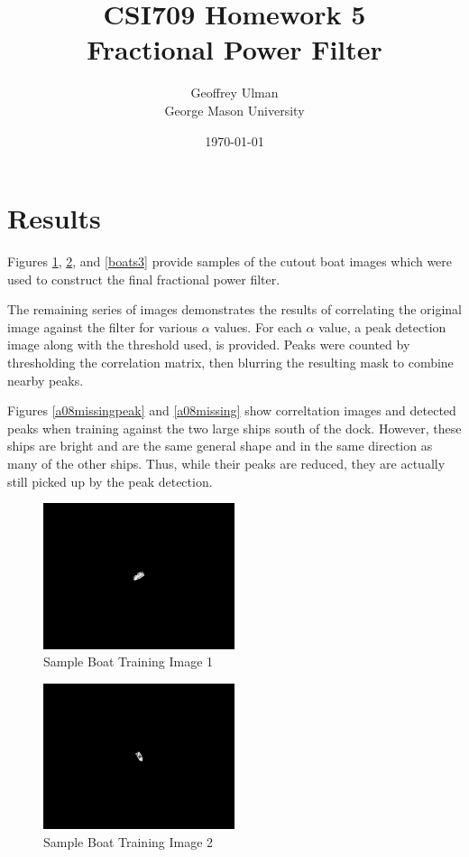 \documentclass[12pt]{article}
\begin{document}
\title{CSI709 Homework 5 \\
Fractional Power Filter}
\author{
        Geoffrey Ulman \\
        George Mason University\\
}
\date{\today}

\maketitle

\section{Results}

Figures \ref{boats1}, \ref{boats2}, and \ref{boats3} provide samples of the cutout boat images which were used to construct the final fractional power filter.

The remaining series of images demonstrates the results of correlating the original image against the filter for various \(\alpha\) values. For each \(\alpha\) value, a peak detection image along with the threshold used, is provided. Peaks were counted by thresholding the correlation matrix, then blurring the resulting mask to combine nearby peaks.

Figures \ref{a08missingpeak} and \ref{a08missing} show correltation images and detected peaks when training against the two large ships south of the dock. However, these ships are bright and are the same general shape and in the same direction as many of the other ships. Thus, while their peaks are reduced, they are actually still picked up by the peak detection.

\begin{figure}
\centering
\includegraphics[width=0.50\textwidth]{plotBoat1.png}
\caption{Sample Boat Training Image 1}
\label{boats1}
\end{figure}

\begin{figure}
\centering
\includegraphics[width=0.50\textwidth]{plotBoat2.png}
\caption{Sample Boat Training Image 2}
\label{boats2}
\end{figure}
\end{document}
